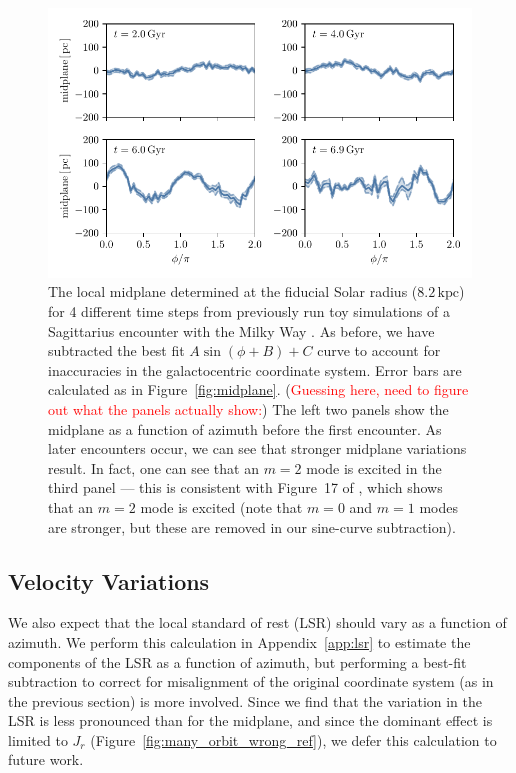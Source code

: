 \documentclass[twocolumn]{aastex62}
\newcommand{\Gus}[1]{\textcolor{red}{#1}}
\newcommand{\kpc}{\text{kpc}}
\begin{document}
\begin{figure}
\begin{center}
\includegraphics[width=5.5in]{fig/midplane_fit_chervinsim.pdf}
\end{center}
\caption{The local midplane determined at the fiducial Solar radius
($8.2\,\kpc$) for 4 different time steps from previously run toy simulations
of a Sagittarius encounter with the Milky Way \citep{2018MNRAS.481..286L}. As
before, we have subtracted the best fit $A\sin{(\phi+B)}+C$ curve to account
for inaccuracies in the galactocentric coordinate system. Error bars are
calculated as in Figure~\ref{fig:midplane}. (\Gus{Guessing here, need to
figure out what the panels actually show:}) The left two panels show the
midplane as a function of azimuth before the first encounter. As later
encounters occur, we can see that stronger midplane variations result. In
fact, one can see that an $m=2$ mode is excited in the third panel --- this is
consistent with Figure~17 of \citet{2018MNRAS.481..286L}, which shows that an
$m=2$ mode is excited (note that $m=0$ and $m=1$ modes are stronger, but these
are removed in our sine-curve subtraction).}
\label{fig:midplane_chervin}
\end{figure}

\subsection{Velocity Variations} \label{ssec:lsr_var}
We also expect that the local standard of rest (LSR) should vary as a function
of azimuth. We perform this calculation in Appendix~\ref{app:lsr} to estimate
the components of the LSR as a function of azimuth, but performing a best-fit
subtraction to correct for misalignment of the original coordinate system (as
in the previous section) is more involved. Since we find that the variation in
the LSR is less pronounced than for the midplane, and since the dominant
effect is limited to $J_r$ (Figure~\ref{fig:many_orbit_wrong_ref}), we defer
this calculation to future work.
\end{document}
